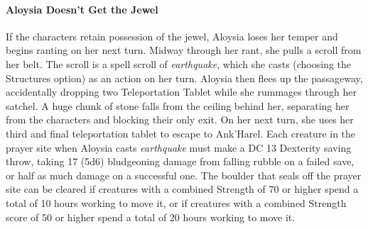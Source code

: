 \documentclass[10pt,a4,twoside,twocolumn,openany,nodeprecatedcode]{dndbook}
\begin{document}
\paragraph{Aloysia Doesn't Get the Jewel}
If the characters retain possession of the jewel, Aloysia loses her temper and begins ranting on her next turn. Midway through her rant, she pulls a scroll from her belt. The scroll is a spell scroll of \textit{earthquake}, which she casts (choosing the Structures option) as an action on her turn. Aloysia then flees up the passageway, accidentally dropping two Teleportation Tablet while she rummages through her satchel. A huge chunk of stone falls from the ceiling behind her, separating her from the characters and blocking their only exit. On her next turn, she uses her third and final teleportation tablet to escape to Ank'Harel.
Each creature in the prayer site when Aloysia casts \textit{earthquake} must make a DC 13 Dexterity saving throw, taking 17 (5d6) bludgeoning damage from falling rubble on a failed save, or half as much damage on a successful one.
The boulder that seals off the prayer site can be cleared if creatures with a combined Strength of 70 or higher spend a total of 10 hours working to move it, or if creatures with a combined Strength score of 50 or higher spend a total of 20 hours working to move it.
\end{document}
